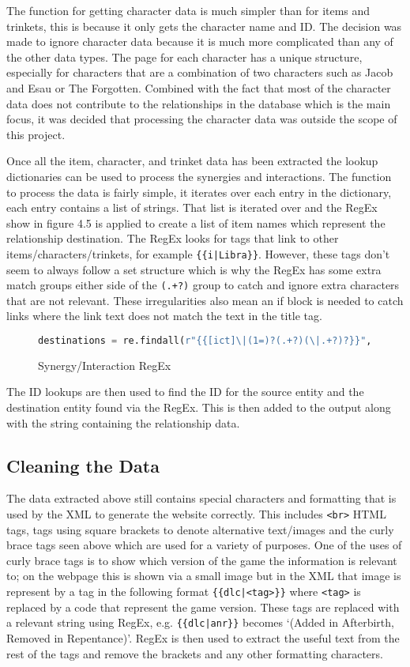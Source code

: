 The function for getting character data is much simpler than for items and trinkets, this is because it only gets the character name and ID. 
The decision was made to ignore character data because it is much more complicated than any of the other data types. The page for each character has 
a unique structure, especially for characters that are a combination of two characters such as Jacob and Esau or The Forgotten. Combined with the fact that 
most of the character data does not contribute to the relationships in the database which is the main focus, it was decided that processing the character data was outside 
the scope of this project. 

Once all the item, character, and trinket data has been extracted the lookup dictionaries can be used to process the synergies and interactions. 
The function to process the data is fairly simple, it iterates over each entry in the dictionary, each entry contains a list of strings. That list is iterated over 
and the RegEx show in figure 4.5 is applied to create a list of item names which represent the relationship destination. The RegEx looks for tags that link to other items/characters/trinkets,
for example \verb#{{i|Libra}}#. However, these tags don't seem to always follow a set structure which is why the RegEx has some extra match groups either side of the \verb|(.+?)| group to catch and ignore extra 
characters that are not relevant. These irregularities also mean an if block is needed to catch links where the link text does not match the text in the title tag.
\begin{figure}[!htbp]
    \begin{lstlisting}[language=Python]
        destinations = re.findall(r"{{[ict]\|(1=)?(.+?)(\|.+?)?}}", relationship[0], re.IGNORECASE)
    \end{lstlisting}
    \caption{Synergy/Interaction RegEx}
\end{figure}
The ID lookups are then used to find the ID for the source entity and the destination entity found via the RegEx. This is then added to the output along with the string containing the relationship data.
\subsection{Cleaning the Data}
The data extracted above still contains special characters and formatting that is used by the XML to generate the website correctly. 
This includes \verb|<br>| HTML tags, tags using square brackets to denote alternative text/images and the curly brace tags seen above which are used for a variety of purposes.
One of the uses of curly brace tags is to show which version of the game the information is relevant to; on the webpage this is shown via a small image but in the XML
that image is represent by a tag in the following format \verb#{{dlc|<tag>}}# where \verb|<tag>| is replaced by a code that represent the game version.
These tags are replaced with a relevant string using RegEx, e.g. \verb#{{dlc|anr}}# becomes `(Added in Afterbirth, Removed in Repentance)'.
RegEx is then used to extract the useful text from the rest of the tags and remove the brackets and any other formatting characters.

